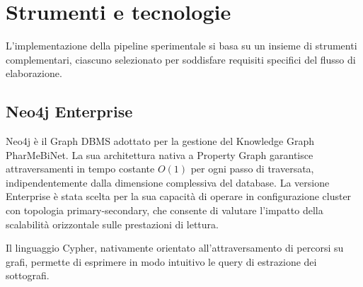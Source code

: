 \section{Strumenti e tecnologie}
L'implementazione della pipeline sperimentale si basa su un insieme di strumenti complementari, ciascuno selezionato per soddisfare requisiti specifici del flusso di elaborazione.

\subsection{Neo4j Enterprise}
Neo4j è il Graph DBMS adottato per la gestione del Knowledge Graph PharMeBiNet. La sua architettura nativa a Property Graph garantisce attraversamenti in tempo costante $O(1)$ per ogni passo di traversata, indipendentemente dalla dimensione complessiva del database. La versione Enterprise è stata scelta per la sua capacità di operare in configurazione cluster con topologia primary-secondary, che consente di valutare l'impatto della scalabilità orizzontale sulle prestazioni di lettura. 

Il linguaggio Cypher, nativamente orientato all'attraversamento di percorsi su grafi, permette di esprimere in modo intuitivo le query di estrazione dei sottografi.

